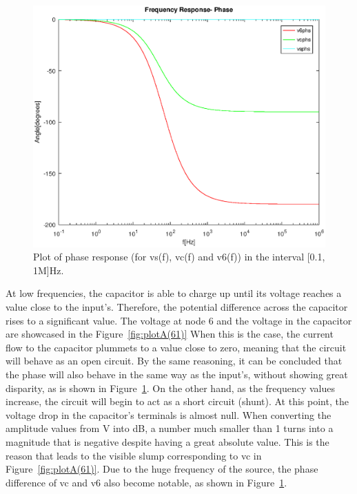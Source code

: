 \begin{figure}[h] \centering
\includegraphics[width=0.6\linewidth]{FrequencyResponsePhase.eps}
\caption{Plot of phase response (for vs(f), vc(f) and v6(f)) in the interval [0.1, 1M]Hz.}
\label{fig:plotA(62)}
\end{figure}

At low frequencies, the capacitor is able to charge up until its voltage reaches a value close to the input's. Therefore, the potential difference across the capacitor rises to a significant value. The voltage at node 6 and the voltage in the capacitor are showcased in the Figure~\ref{fig:plotA(61)} When this is the case, the current flow to the capacitor plummets to a value close to zero, meaning that the circuit will behave as an open circuit. By the same reasoning, it can be concluded that the phase will also behave in the same way as the input's, without showing great disparity, as is shown in Figure~\ref{fig:plotA(62)}. 
On the other hand, as the frequency values increase, the circuit will begin to act as a short circuit (shunt). At this point, the voltage drop in the capacitor's terminals is almost null. When converting the amplitude values from V into dB, a number much smaller than 1 turns into a magnitude that is negative despite having a great absolute value. This is the reason that leads to the visible slump corresponding to vc in Figure~\ref{fig:plotA(61)}. Due to the huge frequency of the source, the phase difference of vc and v6 also become notable, as shown in Figure~\ref{fig:plotA(62)}.


